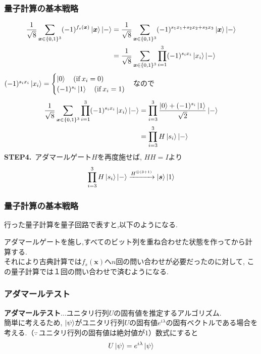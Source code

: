 \documentclass[9pt]{beamer}
\begin{document}
\begin{frame}
    \frametitle{量子計算の基本戦略}
    \begin{align}
        \frac{1}{\sqrt{8}} \sum_{\bm{x} \in \{0,1\}^3} (-1)^{f_s(\bm{x})} \ket{\bm{x}} \ket{-} &=
        \frac{1}{\sqrt{8}} \sum_{\bm{x} \in \{0,1\}^3} (-1)^{s_1x_1 + s_2x_2 + s_3x_3} \ket{\bm{x}} \ket{-} \\
        &= \frac{1}{\sqrt{8}} \sum_{\bm{x} \in \{0,1\}^3} \prod_{i=1}^{3} (-1)^{s_ix_i} \ket{x_i} \ket{-} 
    \end{align}
    $(-1)^{s_ix_i}\ket{x_i} = \begin{cases} \ket{0} \quad (\text{if}\: x_i = 0) \\ (-1)^{s_i}\ket{1} \quad (\text{if} \: x_i = 1) \end{cases}$なので
    \begin{align}
        \frac{1}{\sqrt{8}} \sum_{\bm{x} \in \{0,1\}^3} \prod_{i=1}^{3} (-1)^{s_ix_i} \ket{x_i} \ket{-} &= \prod_{i=3}^{3} \dfrac{\ket{0} + (-1)^{s_i} \ket{1}}{\sqrt{2}} \ket{-} \\
        &= \prod_{i=3}^{3} H\ket{s_i} \ket{-} 
    \end{align}
    \textbf{STEP4.}\, アダマールゲート$H$を再度施せば, $HH = I$より
    \begin{align}
        \prod_{i=3}^{3} H\ket{s_i} \ket{-} \xrightarrow{H^{\otimes(3+1)}} \ket{\bm{s}} \ket{1}
    \end{align}
\end{frame}

\begin{frame}
    \frametitle{量子計算の基本戦略}
    行った量子計算を量子回路で表すと,以下のようになる.
    
    アダマールゲートを施し,すべてのビット列を重ね合わせた状態を作ってから計算する. \\
    それにより古典計算では$f_s(\bm{x})$へ$n$回の問い合わせが必要だったのに対して, この量子計算では１回の問い合わせで済むようになる.
\end{frame}

\begin{frame}
    \frametitle{アダマールテスト}
    \textbf{アダマールテスト}$\ldots$ユニタリ行列$U$の固有値を推定するアルゴリズム.\\
    簡単に考えるため, $\ket{\psi}$がユニタリ行列$U$の固有値$e^{i\lambda}$の固有ベクトルである場合を考える.（$\because\,$ユニタリ行列の固有値は絶対値が$1$）数式にすると\\
    \begin{align}
        U\ket{\psi} = e^{i\lambda}\ket{\psi}
    \end{align}
    

\end{frame}
\end{document}
